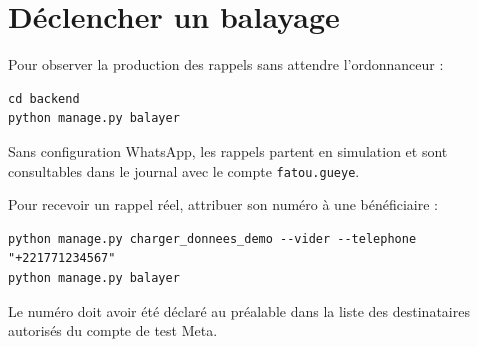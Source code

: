 \documentclass[11pt,a4paper]{report}
\begin{document}
\chapter{Déclencher un balayage}

Pour observer la production des rappels sans attendre l'ordonnanceur :

\begin{lstlisting}
cd backend
python manage.py balayer
\end{lstlisting}

Sans configuration WhatsApp, les rappels partent en simulation et sont
consultables dans le journal avec le compte \texttt{fatou.gueye}.

Pour recevoir un rappel réel, attribuer son numéro à une bénéficiaire :

\begin{lstlisting}
python manage.py charger_donnees_demo --vider --telephone "+221771234567"
python manage.py balayer
\end{lstlisting}

Le numéro doit avoir été déclaré au préalable dans la liste des
destinataires autorisés du compte de test Meta.
\end{document}
